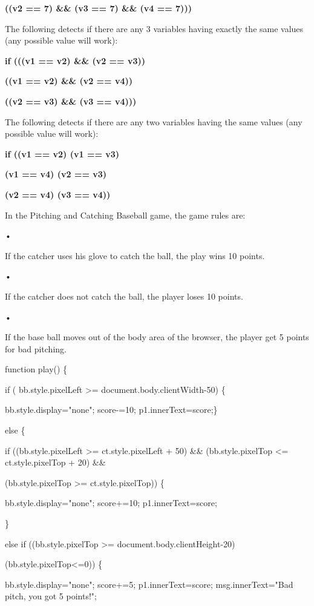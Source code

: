 \documentclass[
]{article}
\begin{document}
\textbf{((v2 == 7) \&\& (v3 == 7) \&\& (v4 == 7)))}

The following detects if there are any 3 variables having exactly the
same values (any possible value will work):

\textbf{if (((v1 == v2) \&\& (v2 == v3)) \textbar\textbar{}}

\textbf{((v1 == v2) \&\& (v2 == v4)) \textbar\textbar{}}

\textbf{((v2 == v3) \&\& (v3 == v4)))}

\textbf{}

The following detects if there are any two variables having the same
values (any possible value will work):

\textbf{if ((v1 == v2) \textbar\textbar{} (v1 == v3) \textbar\textbar{}}

\textbf{(v1 == v4) \textbar\textbar{} (v2 == v3) \textbar\textbar{}}

\textbf{(v2 == v4) \textbar\textbar{} (v3 == v4))}

In the Pitching and Catching Baseball game, the game rules are:

•

If the catcher uses his glove to catch the ball, the play wins 10
points.

•

If the catcher does not catch the ball, the player loses 10 points.

•

If the base ball moves out of the body area of the browser, the player
get 5 points for bad pitching.

function play() \{

if ( bb.style.pixelLeft \textgreater= document.body.clientWidth-50) \{

bb.style.display="none"; score-=10; p1.innerText=score;\}

else \{

if ((bb.style.pixelLeft \textgreater= ct.style.pixelLeft + 50) \&\&
(bb.style.pixelTop \textless= ct.style.pixelTop + 20) \&\&

(bb.style.pixelTop \textgreater= ct.style.pixelTop)) \{

bb.style.display="none"; score+=10; p1.innerText=score;

\}

else if ((bb.style.pixelTop \textgreater= document.body.clientHeight-20)
\textbar\textbar{}

(bb.style.pixelTop\textless=0)) \{

bb.style.display="none"; score+=5; p1.innerText=score;
msg.innerText="Bad pitch, you got 5 points!";
\end{document}
